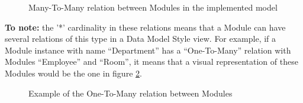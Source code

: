 \begin{figure}[h]
\centering
\renewcommand {\umltextcolor}{black}
\renewcommand {\umlfillcolor}{none}
\renewcommand {\umldrawcolor}{black}
\caption{Many-To-Many relation between Modules in the implemented model}
\label{figure:modelManyToManyRelation}
\end{figure}

\textbf{To note:} the '*' cardinality in these relations means that a Module can have several relations of this type in a Data Model Style view. For example, if a Module instance with name ``Department'' has a ``One-To-Many'' relation with Modules ``Employee'' and ``Room'', it means that a visual representation of these Modules would be the one in figure \ref{figure:modelOneToManyExample}.

\begin{figure}[h]
\centering
\renewcommand {\umltextcolor}{black}
\renewcommand {\umlfillcolor}{none}
\renewcommand {\umldrawcolor}{black}
\caption{Example of the One-To-Many relation between Modules}
\label{figure:modelOneToManyExample}
\end{figure}

